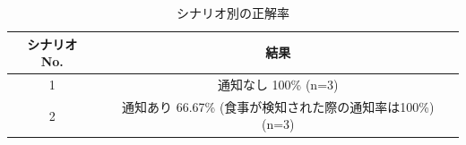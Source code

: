 \begin{table}[htbp]
  \caption{シナリオ別の正解率}
  \label{tb:result_scenarios}
  \begin{center}
    \begin{tabular}{|c||c|}
      \hline
      シナリオ No.  & 結果 \\
      \hline\hline
      1  & 通知なし 100\% (n=3) \\\hline
      2 & 通知あり 66.67\% (食事が検知された際の通知率は100\%) (n=3) \\\hline
    \end{tabular}
  \end{center}
\end{table}




